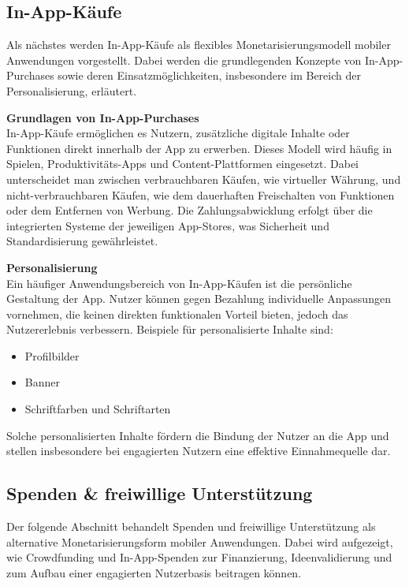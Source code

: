 \subsection{In-App-Käufe}
Als nächstes werden In-App-Käufe als flexibles Monetarisierungsmodell mobiler Anwendungen vorgestellt. Dabei werden die grundlegenden Konzepte von In-App-Purchases sowie deren Einsatzmöglichkeiten, insbesondere im Bereich der Personalisierung, erläutert.

\textbf{Grundlagen von In-App-Purchases}\\
In-App-Käufe ermöglichen es Nutzern, zusätzliche digitale Inhalte oder Funktionen direkt innerhalb der App zu erwerben. Dieses Modell wird häufig in Spielen, Produktivitäts-Apps und Content-Plattformen eingesetzt. Dabei unterscheidet man zwischen verbrauchbaren Käufen, wie virtueller Währung, und nicht-verbrauchbaren Käufen, wie dem dauerhaften Freischalten von Funktionen oder dem Entfernen von Werbung. Die Zahlungsabwicklung erfolgt über die integrierten Systeme der jeweiligen App-Stores, was Sicherheit und Standardisierung gewährleistet.\cite{Kostenpflichtige_Ideen}

\textbf{Personalisierung}\\
Ein häufiger Anwendungsbereich von In-App-Käufen ist die persönliche Gestaltung der App. Nutzer können gegen Bezahlung individuelle Anpassungen vornehmen, die keinen direkten funktionalen Vorteil bieten, jedoch das Nutzererlebnis verbessern. Beispiele für personalisierte Inhalte sind:
\begin{itemize}
    \item Profilbilder
    \item Banner
    \item Schriftfarben und Schriftarten
\end{itemize}
Solche personalisierten Inhalte fördern die Bindung der Nutzer an die App und stellen insbesondere bei engagierten Nutzern eine effektive Einnahmequelle dar.\cite{Kostenpflichtige_Ideen}


\subsection{Spenden \& freiwillige Unterstützung}
Der folgende Abschnitt behandelt Spenden und freiwillige Unterstützung als alternative Monetarisierungsform mobiler Anwendungen. Dabei wird aufgezeigt, wie Crowdfunding und In-App-Spenden zur Finanzierung, Ideenvalidierung und zum Aufbau einer engagierten Nutzerbasis beitragen können.

